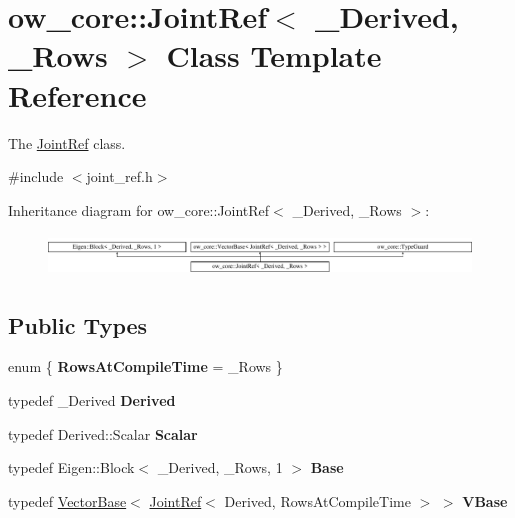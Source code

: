 \hypertarget{classow__core_1_1JointRef}{}\section{ow\+\_\+core\+:\+:Joint\+Ref$<$ \+\_\+\+Derived, \+\_\+\+Rows $>$ Class Template Reference}
\label{classow__core_1_1JointRef}


The \hyperlink{classow__core_1_1JointRef}{Joint\+Ref} class.  




{\ttfamily \#include $<$joint\+\_\+ref.\+h$>$}

Inheritance diagram for ow\+\_\+core\+:\+:Joint\+Ref$<$ \+\_\+\+Derived, \+\_\+\+Rows $>$\+:\begin{figure}[H]
\begin{center}
\leavevmode
\includegraphics[height=1.121121cm]{dc/d00/classow__core_1_1JointRef}
\end{center}
\end{figure}
\subsection*{Public Types}
\begin{DoxyCompactItemize}
\item 
enum \{ {\bfseries Rows\+At\+Compile\+Time} = \+\_\+\+Rows
 \}\hypertarget{classow__core_1_1JointRef_a75414de9c30ae684f11e91ea212418af}{}\label{classow__core_1_1JointRef_a75414de9c30ae684f11e91ea212418af}

\item 
typedef \+\_\+\+Derived {\bfseries Derived}\hypertarget{classow__core_1_1JointRef_aaeaf4c71ed5755529de2299f2fadaf35}{}\label{classow__core_1_1JointRef_aaeaf4c71ed5755529de2299f2fadaf35}

\item 
typedef Derived\+::\+Scalar {\bfseries Scalar}\hypertarget{classow__core_1_1JointRef_aebe08b5cb8fbc5086b512baebc02e9cd}{}\label{classow__core_1_1JointRef_aebe08b5cb8fbc5086b512baebc02e9cd}

\item 
typedef Eigen\+::\+Block$<$ \+\_\+\+Derived, \+\_\+\+Rows, 1 $>$ {\bfseries Base}\hypertarget{classow__core_1_1JointRef_a97912dc6b5b99487801e12c3dbdee9e7}{}\label{classow__core_1_1JointRef_a97912dc6b5b99487801e12c3dbdee9e7}

\item 
typedef \hyperlink{classow__core_1_1VectorBase}{Vector\+Base}$<$ \hyperlink{classow__core_1_1JointRef}{Joint\+Ref}$<$ Derived, Rows\+At\+Compile\+Time $>$ $>$ {\bfseries V\+Base}\hypertarget{classow__core_1_1JointRef_a5045e48f1242ee785794e994eb7d2022}{}\label{classow__core_1_1JointRef_a5045e48f1242ee785794e994eb7d2022}

\end{DoxyCompactItemize}
